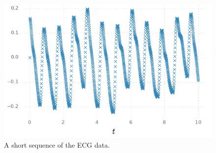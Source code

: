  
 \begin{figure}[htbp]%
    \centering%
    \includegraphics{img/harmonic_trajectory}%
	\caption{%
	A short sequence of the ECG data. %
   	}
	\label{fig:ecg_data}
 \end{figure}
 
